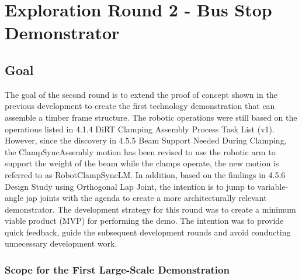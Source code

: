 \chapter{Exploration Round 2 - Bus Stop Demonstrator}
\label{chapter:exploration_round_2}

\section{Goal}
\label{section:exploration_2_goal}

The goal of the second round is to extend the proof of concept shown in the previous development to create the first technology demonstration that can assemble a timber frame structure. The robotic operations were still based on the operations listed in 4.1.4 DiRT Clamping Assembly Process Task List (v1). However, since the discovery in 4.5.5 Beam Support Needed During Clamping, the ClampSyncAssembly motion has been revised to use the robotic arm to support the weight of the beam while the clamps operate, the new motion is referred to as RobotClampSyncLM.
In addition, based on the findings in 4.5.6 Design Study using Orthogonal Lap Joint, the intention is to jump to variable-angle jap joints with the agenda to create a more architecturally relevant demonstrator. 
The development strategy for this round was to create a minimum viable product (MVP) for performing the demo. The intention was to provide quick feedback, guide the subsequent development rounds and avoid conducting unnecessary development work. 

\subsection{Scope for the First Large-Scale Demonstration}
\label{subsection:exploration_2_scope_for_the_first_large_scale_demonstration}

